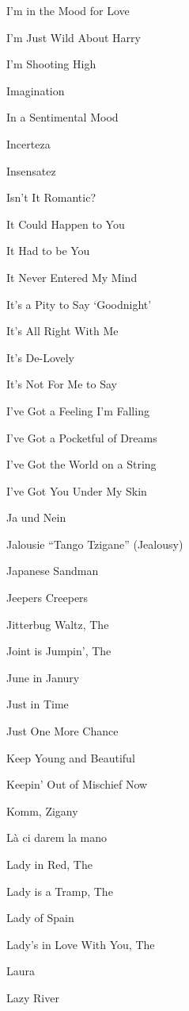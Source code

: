 \N I'm in the Mood for Love

\N I'm Just Wild About Harry

\N I'm Shooting High

\N Imagination

\N In a Sentimental Mood

\N Incerteza

\N Insensatez

\N Isn't It Romantic?

\N {}

\N It Could Happen to You

\N It Had to be You

\N It Never Entered My Mind

\N It's a Pity to Say `Goodnight'

\N It's All Right With Me

\N It's De-Lovely

\N It's Not For Me to Say

\N I've Got a Feeling I'm Falling

\N I've Got a Pocketful of Dreams

\N I've Got the World on a String

\N I've Got You Under My Skin

\N Ja und Nein

\N Jalousie ``Tango Tzigane'' (Jealousy)

\N Japanese Sandman

\N Jeepers Creepers

\N Jitterbug Waltz, The

\N Joint is Jumpin', The

\N June in Janury

\N Just in Time

\N Just One More Chance

\N Keep Young and Beautiful

\N Keepin' Out of Mischief Now

\N Komm, Zigany

\N L{\`a} ci darem la mano

\N Lady in Red, The

\N Lady is a Tramp, The

\N Lady of Spain

\N Lady's in Love With You, The

\N Laura

\N Lazy River


